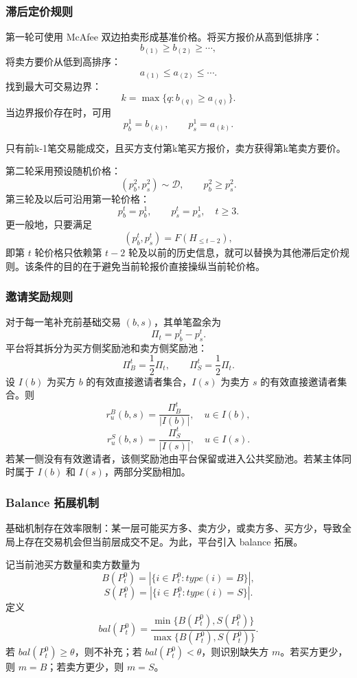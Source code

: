 \documentclass[UTF8,a4paper,12pt]{ctexart}
\begin{document}
\subsubsection{滞后定价规则}

第一轮可使用 McAfee 双边拍卖形成基准价格。将买方报价从高到低排序：
\[
    b_{(1)}\ge b_{(2)}\ge\cdots,
\]
将卖方要价从低到高排序：
\[
    a_{(1)}\le a_{(2)}\le\cdots.
\]
找到最大可交易边界：
\[
    k=\max\{q:b_{(q)}\ge a_{(q)}\}.
\]
当边界报价存在时，可用
\[
    p_b^1=b_{(k)},\qquad p_s^1=a_{(k)}.
\]

只有前k-1笔交易能成交，且买方支付第k笔买方报价，卖方获得第k笔卖方要价。

第二轮采用预设随机价格：
\[
    (p_b^2,p_s^2)\sim\mathcal D,\qquad p_b^2\ge p_s^2.
\]
第三轮及以后可沿用第一轮价格：
\[
    p_b^t=p_b^1,\qquad p_s^t=p_s^1,\quad t\ge3.
\]
更一般地，只要满足
\[
    (p_b^t,p_s^t)=F(H_{\le t-2}),
\]
即第 \(t\) 轮价格只依赖第 \(t-2\) 轮及以前的历史信息，就可以替换为其他滞后定价规则。该条件的目的在于避免当前轮报价直接操纵当前轮价格。

\subsubsection{邀请奖励规则}

对于每一笔补充前基础交易 \((b,s)\)，其单笔盈余为
\[
    \Pi_t=p_b^t-p_s^t.
\]
平台将其拆分为买方侧奖励池和卖方侧奖励池：
\[
    \Pi_B^t=\frac{1}{2}\Pi_t,\qquad
    \Pi_S^t=\frac{1}{2}\Pi_t.
\]
设 \(I(b)\) 为买方 \(b\) 的有效直接邀请者集合，\(I(s)\) 为卖方 \(s\) 的有效直接邀请者集合。则
\[
    r_u^B(b,s)=\frac{\Pi_B^t}{|I(b)|},\quad u\in I(b),
\]
\[
    r_u^S(b,s)=\frac{\Pi_S^t}{|I(s)|},\quad u\in I(s).
\]
若某一侧没有有效邀请者，该侧奖励池由平台保留或进入公共奖励池。若某主体同时属于 \(I(b)\) 和 \(I(s)\)，两部分奖励相加。

\subsubsection{Balance 拓展机制}

基础机制存在效率限制：某一层可能买方多、卖方少，或卖方多、买方少，导致全局上存在交易机会但当前层成交不足。为此，平台引入 balance 拓展。

记当前池买方数量和卖方数量为
\[
    B(P_t^0)=|\{i\in P_t^0:type(i)=B\}|,
\]
\[
    S(P_t^0)=|\{i\in P_t^0:type(i)=S\}|.
\]
定义
\[
    bal(P_t^0)=
    \frac{\min\{B(P_t^0),S(P_t^0)\}}
    {\max\{B(P_t^0),S(P_t^0)\}}.
\]
若 \(bal(P_t^0)\ge\theta\)，则不补充；若 \(bal(P_t^0)<\theta\)，则识别缺失方 \(m\)。若买方更少，则 \(m=B\)；若卖方更少，则 \(m=S\)。
\end{document}
